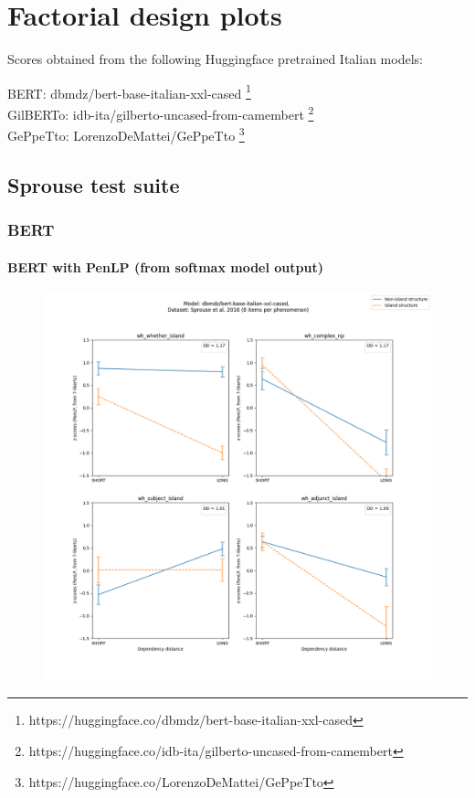 \chapter{Factorial design plots}

Scores obtained from the following Huggingface pretrained Italian models:

BERT: dbmdz/bert-base-italian-xxl-cased \footnote{https://huggingface.co/dbmdz/bert-base-italian-xxl-cased} \\
GilBERTo: idb-ita/gilberto-uncased-from-camembert \footnote{https://huggingface.co/idb-ita/gilberto-uncased-from-camembert} \\
GePpeTto: LorenzoDeMattei/GePpeTto \citep{de2020geppetto} \footnote{https://huggingface.co/LorenzoDeMattei/GePpeTto} \\

\clearpage
\section{Sprouse test suite}

\subsection{BERT}

\subsubsection{BERT with PenLP (from softmax model output)}

\begin{figure}[h]
	\centering
	\includegraphics[width=1\textwidth]{images/AppendixA/Sprouse_wh_dbmdz_bert-base-italian-xxl-cased_PenLP-zscores-likert-2022-07-11.png} 
	\label{A-fig:bert_penlp_sprouse}
\end{figure}

